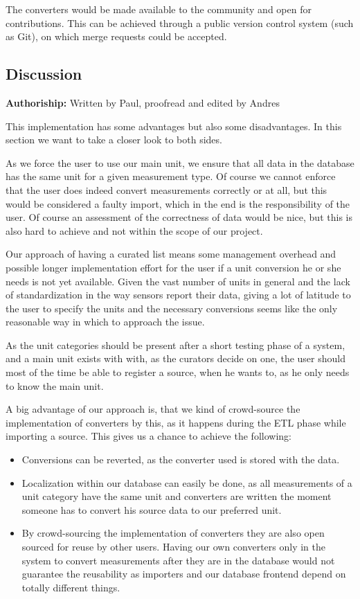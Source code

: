 The converters would be made available to the community and open for
contributions. This can be achieved through a public version control
system (such as Git), on which merge requests could be accepted.

\subsection{Discussion}\label{discussion}

\textbf{Authoriship:} Written by Paul, proofread and edited by Andres
\vspace{10 pt}

This implementation has some advantages but also some disadvantages. In
this section we want to take a closer look to both sides.

As we force the user to use our main unit, we ensure that all data in
the database has the same unit for a given measurement type. Of course
we cannot enforce that the user does indeed convert measurements
correctly or at all, but this would be considered a faulty import, which
in the end is the responsibility of the user. Of course an assessment of
the correctness of data would be nice, but this is also hard to achieve
and not within the scope of our project.

Our approach of having a curated list means some management overhead and
possible longer implementation effort for the user if a unit conversion
he or she needs is not yet available. Given the vast number of units in
general and the lack of standardization in the way sensors report their
data, giving a lot of latitude to the user to specify the units and the
necessary conversions seems like the only reasonable way in which to
approach the issue.

As the unit categories should be present after a short testing phase of
a system, and a main unit exists with with, as the curators decide on
one, the user should most of the time be able to register a source, when
he wants to, as he only needs to know the main unit.

A big advantage of our approach is, that we kind of crowd-source the
implementation of converters by this, as it happens during the ETL phase
while importing a source. This gives us a chance to achieve the following:

\begin{itemize}
\tightlist
\item
  Conversions can be reverted, as the converter used is stored with the
  data.
\item
  Localization within our database can easily be done, as all
  measurements of a unit category have the same unit and converters are
  written the moment someone has to convert his source data to our
  preferred unit.
\item
  By crowd-sourcing the implementation of converters they are also open
  sourced for reuse by other users. Having our own converters only in
  the system to convert measurements after they are in the database
  would not guarantee the reusability as importers and our database
  frontend depend on totally different things.
\end{itemize}

